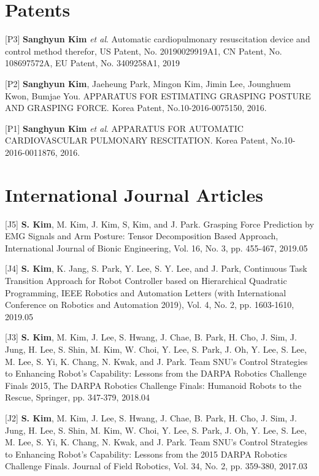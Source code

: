 \documentclass[margin,line]{res}
\begin{document}
\begin{resume}
\section{\sc Patents} 
[P3]  \textbf{Sanghyun Kim} \textit{et al}. Automatic cardiopulmonary resuscitation device and control method therefor, US Patent, No. 20190029919A1, CN Patent, No. 108697572A, EU Patent, No. 3409258A1, 2019

[P2] \textbf{Sanghyun Kim}, {Jaeheung Park}, Mingon Kim, Jimin Lee, Jounghuem Kwon, Bumjae You. 
APPARATUS FOR ESTIMATING GRASPING POSTURE AND GRASPING FORCE.
Korea Patent, No.10-2016-0075150, 2016.

[P1] \textbf{Sanghyun Kim} \textit{et al}. 
APPARATUS FOR AUTOMATIC CARDIOVASCULAR PULMONARY RESCITATION.
Korea Patent, No.10-2016-0011876, 2016.
%

\section{\sc International Journal Articles}


[J5] \textbf{S. Kim}, M. Kim, J. Kim, S, Kim, and J. Park.
Grasping Force Prediction by EMG Signals and Arm Posture: Tensor Decomposition Based Approach,
International Journal of Bionic Engineering, Vol. 16, No. 3, pp.  455-467, 2019.05

[J4] \textbf{S. Kim}, K. Jang, S. Park, Y. Lee, S. Y. Lee, and J. Park, Continuous Task Transition Approach for Robot Controller based on Hierarchical Quadratic Programming, IEEE Robotics and Automation Letters (with International Conference on Robotics and Automation 2019), Vol. 4, No. 2, pp. 1603-1610, 2019.05

[J3] \textbf{S. Kim}, M. Kim, J. Lee, S. Hwang, J. Chae, B. Park, H. Cho, J. Sim, J. Jung, H. Lee, S. Shin, M. Kim, W. Choi, Y. Lee, S. Park, J. Oh, Y. Lee, S. Lee, M. Lee, S. Yi, K. Chang, N. Kwak, and {J. Park}.
Team SNU’s Control Strategies to Enhancing Robot’s Capability: Lessons from the DARPA Robotics Challenge Finals 2015, The DARPA Robotics Challenge Finals: Humanoid Robots to the Rescue, Springer, pp. 347-379, 2018.04

[J2] \textbf{S. Kim}, M. Kim, J. Lee, S. Hwang, J. Chae, B. Park, H. Cho, J. Sim, J. Jung, H. Lee, S. Shin, M. Kim, W. Choi, Y. Lee, S. Park, J. Oh, Y. Lee, S. Lee, M. Lee, S. Yi, K. Chang, N. Kwak, and {J. Park}.
Team SNU’s Control Strategies to Enhancing Robot’s Capability: Lessons from the 2015 DARPA Robotics Challenge Finals. Journal of Field Robotics, Vol. 34, No. 2, pp. 359-380, 2017.03


\end{resume}
\end{document}
